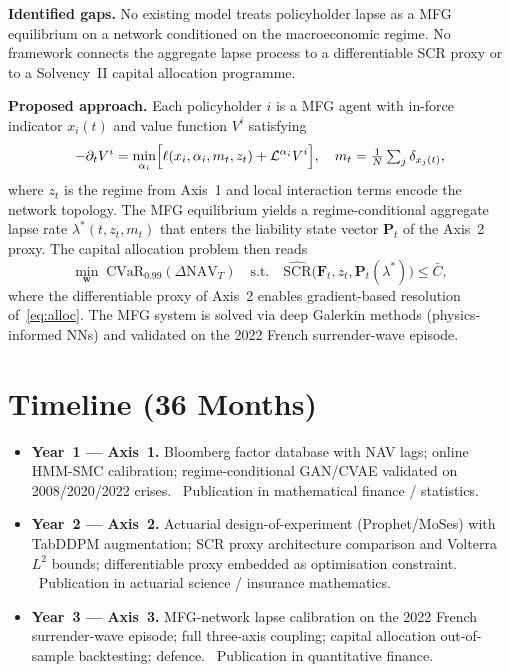 \documentclass[11pt,a4paper]{article}
\begin{document}
\noindent\textbf{Identified gaps.}
No existing model treats policyholder lapse as a MFG equilibrium on a
network conditioned on the macroeconomic regime. No framework connects the
aggregate lapse process to a differentiable SCR proxy or to a Solvency~II
capital allocation programme.

\noindent\textbf{Proposed approach.}
Each policyholder $i$ is a MFG agent with in-force indicator $x_i(t)$ and
value function $V^i$ satisfying
\begin{equation}
  -\partial_t V^i
  = \min_{\alpha_i}\Bigl[\ell(x_i,\alpha_i,m_t,z_t)
    + \mathcal{L}^{\alpha_i}V^i\Bigr],
  \quad m_t = \tfrac{1}{N}\textstyle\sum_j\delta_{x_j(t)},
\label{eq:mfg}
\end{equation}
where $z_t$ is the regime from Axis~1 and local interaction terms encode
the network topology. The MFG equilibrium yields a regime-conditional
aggregate lapse rate $\lambda^*(t,z_t,m_t)$ that enters the liability
state vector $\mathbf{P}_t$ of the Axis~2 proxy. The capital allocation
problem then reads
\begin{equation}
  \min_{\mathbf{w}}\;\mathrm{CVaR}_{0.99}(\Delta\mathrm{NAV}_T)
  \quad\text{s.t.}\quad
  \widehat{\mathrm{SCR}}\!\bigl(\mathbf{F}_t,z_t,\mathbf{P}_t(\lambda^*)\bigr)
  \le \bar{C},
\label{eq:alloc}
\end{equation}
where the differentiable proxy of Axis~2 enables gradient-based resolution
of~\eqref{eq:alloc}. The MFG system is solved via deep Galerkin methods
(physics-informed NNs) and validated on the 2022 French surrender-wave
episode.


\section{Timeline (36 Months)}

\begin{itemize}[leftmargin=1.6em,itemsep=2pt]
  \item \textbf{Year~1 --- Axis~1.}
        Bloomberg factor database with NAV lags; online HMM-SMC calibration;
        regime-conditional GAN/CVAE validated on 2008/2020/2022 crises.
        \ Publication in mathematical finance / statistics.
  \item \textbf{Year~2 --- Axis~2.}
        Actuarial design-of-experiment (Prophet/MoSes) with TabDDPM
        augmentation; SCR proxy architecture comparison and Volterra $L^2$
        bounds; differentiable proxy embedded as optimisation constraint.
        \ Publication in actuarial science / insurance mathematics.
  \item \textbf{Year~3 --- Axis~3.}
        MFG-network lapse calibration on the 2022 French surrender-wave
        episode; full three-axis coupling; capital allocation out-of-sample
        backtesting; defence.
        \ Publication in quantitative finance.
\end{itemize}
\end{document}
